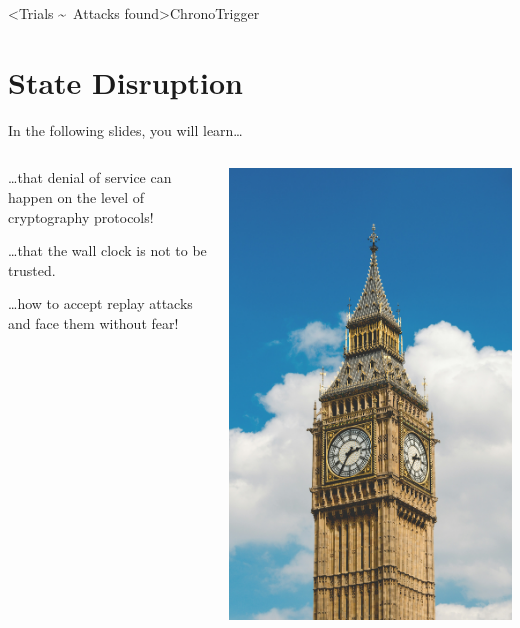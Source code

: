 \interlude[2]<Trials \textasciitilde\ Attacks found>{ChronoTrigger}
\section{State Disruption}

\begin{frame}[light]{In the following slides, you will learn…}
\begin{columns}[fullwidth]
  \begin{column}{.58\linewidth}
    …that denial of service can happen on the level of cryptography protocols!

    \vspace{2em}
    …that the wall clock is not to be trusted.

    \vspace{2em}
    …how to accept replay attacks and face them without fear!
  \end{column}
  \begin{column}{.20\linewidth}
    \includegraphics[width=\linewidth]{graphics/big-ben.jpg}

\end{column}
\end{columns}
\end{frame}
